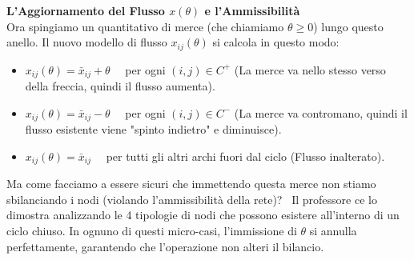 \documentclass[12pt, a4paper]{article}
\begin{document}
	\vspace{0.4cm}
	\textbf{L'Aggiornamento del Flusso $x(\theta)$ e l'Ammissibilità}\\
	Ora spingiamo un quantitativo di merce (che chiamiamo $\theta \geq 0$) lungo questo anello. Il nuovo modello di flusso $x_{ij}(\theta)$ si calcola in questo modo:
	\begin{itemize}[label=$\circ$, itemsep=2pt, leftmargin=1.5cm]
		\item $x_{ij}(\theta) = \bar{x}_{ij} + \theta \quad$ per ogni $(i,j) \in C^+$ (La merce va nello stesso verso della freccia, quindi il flusso aumenta).
		\item $x_{ij}(\theta) = \bar{x}_{ij} - \theta \quad$ per ogni $(i,j) \in C^-$ (La merce va contromano, quindi il flusso esistente viene "spinto indietro" e diminuisce).
		\item $x_{ij}(\theta) = \bar{x}_{ij} \quad$ per tutti gli altri archi fuori dal ciclo (Flusso inalterato).
	\end{itemize}
	
	Ma come facciamo a essere sicuri che immettendo questa merce non stiamo sbilanciando i nodi (violando l'ammissibilità della rete)? 
	Il professore ce lo dimostra analizzando le 4 tipologie di nodi che possono esistere all'interno di un ciclo chiuso. In ognuno di questi micro-casi, l'immissione di $\theta$ si annulla perfettamente, garantendo che l'operazione non alteri il bilancio.
	
\end{document}

